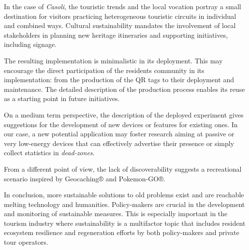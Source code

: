 \documentclass[sustainability,article,submit,pdftex,moreauthors]{Definitions/mdpi}
\begin{document}
In the case of \emph{Casoli}, the touristic trends and the local vocation portray a small destination for visitors practicing heterogeneous touristic circuits in individual and combined ways. Cultural sustainability mandates the involvement of local stakeholders in planning new heritage itineraries and supporting initiatives, including signage.

The resulting implementation is minimalistic in its deployment. This may encourage the direct participation of the residents community in its implementation: from the production of the QR tags to their deployment and maintenance. The detailed description of the production process enables its reuse as a starting point in future initiatives.

On a medium term perspective, the description of the deployed experiment gives suggestions for the development of new devices or features for existing ones. In our case, a new potential application may foster research aiming at passive or very low-energy devices that can effectively advertise their presence or simply collect statistics in \emph{dead-zones}.

From a different point of view, the lack of discoverability suggests a recreational scenario inspired by Geocaching® and Pokemon-GO®.

In conclusion, more sustainable solutions to old problems exist and are reachable melting technology and humanities. Policy-makers are crucial in the development and monitoring of sustainable measures. This is especially important in the tourism industry where sustainability is a multifactor topic that includes resident ecosystem resilience and regeneration efforts by both policy-makers and private tour operators.


\end{document}
